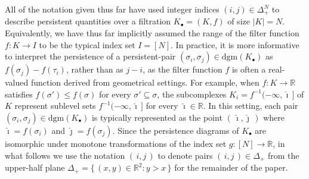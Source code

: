 \documentclass[10pt]{article}
\numberwithin{equation}{section}
\newcommand{\+}{%
	\raisebox{0.18ex}{\scaleobj{0.55}{+}}
}
\theoremstyle{definition}
\begin{document}
All of the notation given thus far have used integer indices $(i,j) \in \Delta_+^N$ to describe persistent quantities over a filtration $K_\bullet = (K, f)$ of size $\lvert K \rvert = N$. Equivalently, we have thus far implicitly assumed the range of the filter function $f : K \to I$ to be the typical index set $I = [N]$.
In practice, it is more informative to interpret the persistence of a persistent-pair $(\sigma_i, \sigma_j) \in \mathrm{dgm}(K_\bullet)$ as $f(\sigma_j) - f(\tau_i)$, rather than as $j - i$, as the filter function $f$ is often a real-valued function derived from geometrical settings.
For example, when $f : K \to \mathbb{R}$ satisfies $f(\sigma') \leq f(\sigma)$ for every $\sigma' \subseteq \sigma$, the subcomplexes $K_i = f^{-1}(-\infty, \hat\imath \,]$ of $K$ represent sublevel sets $f^{-1}(-\infty, \hat\imath \,]$ for every $\hat\imath \in \mathbb{R}$. 
In this setting, each pair $(\sigma_i, \sigma_j) \in \mathrm{dgm}(K_\bullet)$ is typically represented as the point $(\, \hat\imath, \hat\jmath \, )$ where $\hat\imath = f(\sigma_i)$ and $\hat\jmath = f(\sigma_j)$.
Since the persistence diagrams of $K_\bullet$ are isomorphic under monotone transformations of the index set $g : [N] \to \mathbb{R}$, in what follows we use the notation $(\,i, j\,)$ to denote pairs $(\,i, j\,) \in \Delta_{+}$ from the upper-half plane $\Delta_{+} = \{ \, (x,y) \in \mathbb{R}^2 : y > x \, \} $ for the remainder of the paper.


\end{document}

